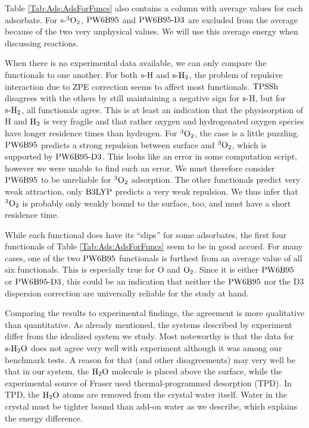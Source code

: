 Table \ref{Tab:Ads:AdsForFuncs} also contains a column with average values
for each adsorbate.
For $\text{s-}{^3\ensuremath{\text O_2}}$, $\text{PW6B95}$ and $\text{PW6B95}\text{-D3}$ are excluded from the average because of
the two very unphysical values. We will use this average energy
when discussing reactions.

When there is no experimental data available, we can only compare the
functionals to one another. For both $\text{s-}\text H$ and $\text{s-}\text H_2$, the
problem of repulsive interaction due to ZPE correction seems to affect
most functionals. $\text{TPSSh}$ disagrees with the others by still maintaining
a negative sign for $\text{s-}$H, but for $\text{s-}\text H_2$, all functionals agree.
This is at least an indication that the physisorption of H and $\text H_2$ is
very fragile and that rather oxygen and hydrogenated oxygen species
have longer residence times than hydrogen.
For ${^3\text O_2}$, the case is a little puzzling. $\text{PW6B95}$ predicts a strong
repulsion between surface and ${^3\text O_2}$, which is supported by
$\text{PW6B95}\text{-D3}$. This looks like an error in some computation script, however we were
unable to find such an error. We must therefore consider $\text{PW6B95}$
to be unreliable for ${^3\text O_2}$ adsorption. The other
functionals predict very weak attraction, only $\text{B3LYP}$ predicts
a very weak repulsion. We thus infer that ${^3\text O_2}$ is
probably only weakly bound to the surface, too, and must have a short
residence time.

While each functional does have its ``slips'' for some adsorbates, the first four functionals of
Table \ref{Tab:Ads:AdsForFuncs} seem to be in good accord. 
For many cases, one of the two $\text{PW6B95}$ functionals is furthest from an average
value of all six functionals. This is especially true for O and $\text O_2$.
Since it is either $\text{PW6B95}$ or $\text{PW6B95}\text{-D3}$, this could be an indication
that neither the $\text{PW6B95}$ nor the D3 dispersion correction are universally
reliable for the study at hand.

Comparing the results to experimental findings, the agreement is more qualitative
than quantitative. As already mentioned, the systems described by experiment
differ from the idealized system we study. Most noteworthy is that the data for $\text{s-}\text H _2 \text O$
does not agree very well with experiment although it was among our
benchmark tests. A reason for that (and other disagreements) may very well be
that in our system, the $\text H _2 \text O$ molecule is placed above the surface, while the
experimental source of Fraser used thermal-programmed desorption
(TPD).\cite{Fraser2001} In TPD, the $\text H _2 \text O$ atoms are removed from the crystal
water itself. Water in the crystal must be tighter bound than add-on water as we
describe, which explains the energy difference.

